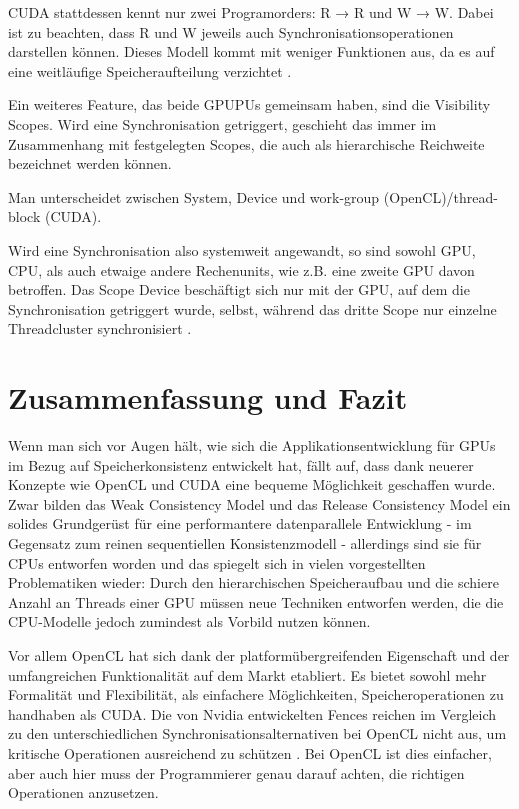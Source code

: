 \documentclass[final,bibliography=totocnumbered]{include/sikseminar}
\begin{document}
CUDA stattdessen kennt nur zwei Programorders: R → R und W → W.
Dabei ist zu beachten, dass R und W jeweils auch Synchronisationsoperationen darstellen können.
Dieses Modell kommt mit weniger Funktionen aus, da es auf eine weitläufige Speicheraufteilung verzichtet \cite{eesmog}.

Ein weiteres Feature, das beide GPUPUs gemeinsam haben, sind die Visibility Scopes.
Wird eine Synchronisation getriggert, geschieht das immer im Zusammenhang mit festgelegten Scopes, die 
auch als hierarchische Reichweite bezeichnet werden können.

Man unterscheidet zwischen System, Device und work-group (OpenCL)/thread-block (CUDA).

Wird eine Synchronisation also systemweit angewandt, so sind sowohl GPU, CPU, als auch etwaige andere Rechenunits, wie z.B. eine zweite GPU davon betroffen.
Das Scope Device beschäftigt sich nur mit der GPU, auf dem die Synchronisation getriggert wurde, selbst, während das dritte Scope 
nur einzelne Threadcluster synchronisiert \cite{denovor}.








\section{Zusammenfassung und Fazit}
Wenn man sich vor Augen hält, wie sich die Applikationsentwicklung für GPUs im Bezug auf Speicherkonsistenz entwickelt hat,
fällt auf, dass dank neuerer Konzepte wie OpenCL und CUDA eine bequeme Möglichkeit geschaffen wurde.
Zwar bilden das Weak Consistency Model und das Release Consistency Model ein solides Grundgerüst für eine performantere datenparallele Entwicklung \cite{mcm5} - im Gegensatz zum reinen sequentiellen Konsistenzmodell - allerdings sind sie für CPUs entworfen worden und das spiegelt sich in vielen vorgestellten Problematiken wieder:
Durch den hierarchischen Speicheraufbau und die schiere Anzahl an Threads einer GPU müssen neue Techniken entworfen werden, die die CPU-Modelle jedoch zumindest als Vorbild nutzen können.

Vor allem OpenCL hat sich dank der platformübergreifenden Eigenschaft und der umfangreichen Funktionalität auf dem Markt etabliert.
Es bietet sowohl mehr Formalität und Flexibilität, als einfachere Möglichkeiten, Speicheroperationen zu handhaben als CUDA.
Die von Nvidia entwickelten Fences reichen im Vergleich zu den unterschiedlichen Synchronisationsalternativen bei OpenCL nicht aus,
um kritische Operationen ausreichend zu schützen \cite{gpucc}. 
Bei OpenCL ist dies einfacher, aber auch hier muss der Programmierer genau darauf achten, die richtigen Operationen anzusetzen.
\end{document}
